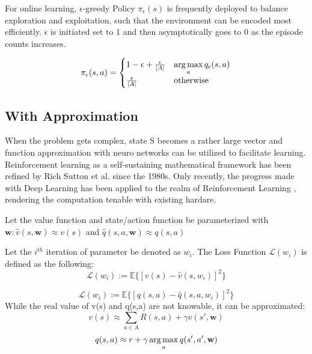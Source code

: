 For online learning, $\epsilon$-greedy Policy $\pi_{\epsilon}(s)$ is frequently deployed to balance exploration and exploitation, such that the environment can be encoded most efficiently. $\epsilon$ is initiated set to 1 and then asymptotically goes to 0 as the episode counts increases.

\begin{equation*}
    \pi_{\epsilon}(s,a) = \begin{cases}
        1-\epsilon+\frac{\epsilon}{|A|}& \displaystyle\operatorname*{arg\,max}_{a} q_{\epsilon}(s,a)\\
        \frac{\epsilon}{|A|}& \text{otherwise}\\
           \end{cases}
\end{equation*}

\subsection{With Approximation}
When the problem gets complex, state S becomes a rather large vector and function approximation with neuro networks can be utilized to facilitate learning. Reinforcement learning as a self-sustaining mathematical framework has been refined by Rich Sutton et al. since the 1980s. Only recently, the progress made with Deep Learning has been applied to the realm of Reinforcement Learning \cite{Mnih2013PlayingAW}, rendering the computation tenable with existing hardare.

Let the value function and state/action function be parameterized with $\textbf{w}:  \hat{v}(s,\textbf{w}) \approx v(s)$ and $\hat{q}(s,a,\textbf{w}) \approx q(s,a) $

Let the $i^{th}$ iteration of parameter be denoted as $\textbf{$w_i$}$. The Loss Function $\mathcal{L}(\textbf{$w_i$})$ is defined as the following:
\begin{equation}
    \mathcal{L}(\textbf{$w_i$}) := \mathbb{E}\{[v(s)-\hat{v}(s,\textbf{$w_i$})]^2\}
    \label{v_loss}
\end{equation}

\begin{equation}
    \mathcal{L}(\textbf{$w_i$}) := \mathbb{E}\{[q(s,a)-\hat{q}(s,a,\textbf{$w_i$})]^2\}
    \label{q_loss}
\end{equation}
While the real value of v(s) and q(s,a) are not knowable, it can be approximated:
\begin{equation}
    v(s) \approx \sum_{a \in A} R(s,a)+\gamma v(s',\textbf{w})
    \label{v_approx}
\end{equation}
\begin{equation}
    q(s,a) \approx r+\gamma \argmax_{a} q(s',a',\textbf{w})
    \label{q_approx}
\end{equation}

